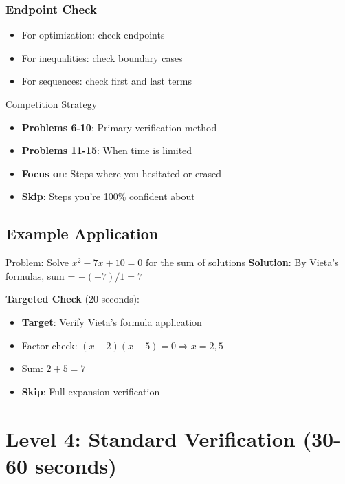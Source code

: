 \documentclass{article}
\newcommand{\problemrange}[1]{\textbf{Problems #1}}
\begin{document}
\subsubsection{Endpoint Check}
\begin{itemize}
\item For optimization: check endpoints
\item For inequalities: check boundary cases
\item For sequences: check first and last terms
\end{itemize}

\begin{contextbox}{Competition Strategy}
\begin{itemize}[nosep]
\item \problemrange{6-10}: Primary verification method
\item \problemrange{11-15}: When time is limited
\item \textbf{Focus on}: Steps where you hesitated or erased
\item \textbf{Skip}: Steps you're 100\% confident about
\end{itemize}
\end{contextbox}

\subsection{Example Application}

\begin{targetedbox}{Problem: Solve $x^2 - 7x + 10 = 0$ for the sum of solutions}
\textbf{Solution}: By Vieta's formulas, sum = $-(-7)/1 = 7$

\textbf{Targeted Check} (20 seconds):
\begin{itemize}[nosep]
\item \textbf{Target}: Verify Vieta's formula application
\item Factor check: $(x-2)(x-5) = 0 \Rightarrow x = 2, 5$
\item Sum: $2 + 5 = 7$ \checkmark
\item \textbf{Skip}: Full expansion verification
\end{itemize}
\end{targetedbox}

\newpage

\section{Level 4: Standard Verification (30-60 seconds)}
\end{document}
